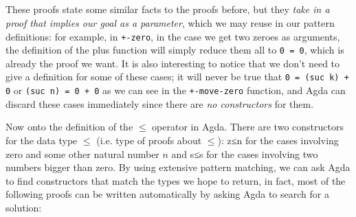 {\begin{code}
\AgdaOperator{\AgdaPrimitive{+}}\AgdaSpace{}%
\<%
\\
\>[0]\AgdaSpace{}%
\AgdaSpace{}%
\AgdaSpace{}%
\AgdaSpace{}%
\AgdaSymbol{=}\AgdaSpace{}%
\<%
\\
\>[0]\AgdaSpace{}%
\AgdaSpace{}%
\AgdaSymbol{(}\AgdaSpace{}%
\AgdaSymbol{)}\AgdaSpace{}%
\AgdaSymbol{()}\<%
\\
\>[0]\AgdaSpace{}%
\AgdaSymbol{(}\AgdaSpace{}%
\AgdaSymbol{)}\AgdaSpace{}%
\AgdaSpace{}%
\AgdaSymbol{()}\<%
\\
\>[0]\AgdaSpace{}%
\AgdaSymbol{(}\AgdaSpace{}%
\AgdaSymbol{)}\AgdaSpace{}%
\AgdaSymbol{(}\AgdaSpace{}%
\AgdaSpace{}%
\AgdaDottedPattern{\AgdaOperator{\AgdaPrimitive{+}}}\AgdaSpace{}%
\AgdaDottedPattern{\AgdaSymbol{)}}\AgdaSymbol{)}\AgdaSpace{}%
\AgdaSpace{}%
\AgdaSymbol{=}\AgdaSpace{}%
\AgdaSpace{}%
\AgdaSpace{}%
\AgdaSymbol{(}\AgdaSpace{}%
\AgdaSpace{}%
\AgdaSymbol{(}\AgdaSpace{}%
\AgdaOperator{\AgdaPrimitive{+}}\AgdaSpace{}%
\AgdaSymbol{)}\AgdaSpace{}%
\AgdaSymbol{)}\<%
\end{code}

These proofs state some similar facts to the proofs before, but they \emph{take in a proof that implies our goal as a parameter}, which we may reuse in our pattern definitions: for example, in \texttt{+-zero}, in the case we get two zeroes as arguments, the definition of the plus function will simply reduce them all to \texttt{0 = 0}, which is already the proof we want. It is also interesting to notice that we don't need to give a definition for some of these cases; it will never be true that \texttt{0 = (suc k) + 0} or \texttt{(suc n) = 0 + 0} as we can see in the \texttt{+-move-zero} function, and Agda can discard these cases immediately since there are \emph{no constructors} for them.

Now onto the definition of the $\le$ operator in Agda. There are two constructors for the data type $\le$ (i.e. type of proofs about $\le$): z≤n for the cases involving zero and some other natural number $n$ and s≤s for the cases involving two numbers bigger than zero. By using extensive pattern matching, we can ask Agda to find constructors that match the types we hope to return, in fact, most of the following proofs can be written automatically by asking Agda to search for a solution:

}
